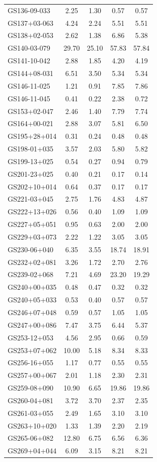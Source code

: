\documentclass{aa}
\begin{document}
\begin{table}
\begin{tabular}{l c c c c }
GS136-09-033	&	2.25	&	1.30	&	0.57	&	0.57	\\
GS137+03-063	&	4.24	&	2.24	&	5.51	&	5.51	\\
GS138+02-053	&	2.62	&	1.38	&	6.86	&	5.38	\\
GS140-03-079	&	29.70	&	25.10	&	57.83	&	57.84	\\
GS141-10-042	&	2.88	&	1.85	&	4.20	&	4.19	\\
GS144+08-031	&	6.51	&	3.50	&	5.34	&	5.34	\\
GS146-11-025	&	1.21	&	0.91	&	7.85	&	7.86	\\
GS146-11-045	&	0.41	&	0.22	&	2.38	&	0.72	\\
GS153+02-047	&	2.46	&	1.40	&	7.79	&	7.74	\\
GS164+00-021	&	2.88	&	3.07	&	5.81	&	6.50	\\
GS195+28+014	&	0.31	&	0.24	&	0.48	&	0.48	\\
GS198-01+035	&	3.57	&	2.03	&	5.80	&	5.82	\\
GS199-13+025	&	0.54	&	0.27	&	0.94	&	0.79	\\
GS201-23+025	&	0.40	&	0.21	&	0.17	&	0.14	\\
GS202+10+014	&	0.64	&	0.37	&	0.17	&	0.17	\\
GS221-03+045	&	2.75	&	1.76	&	4.83	&	4.87	\\
GS222+13+026	&	0.56	&	0.40	&	1.09	&	1.09	\\
GS227+05+051	&	0.95	&	0.63	&	2.00	&	2.00	\\
GS229+03+073	&	2.22	&	1.22	&	3.05	&	3.05	\\
GS230-06+040	&	6.35	&	3.55	&	18.74	&	18.91	\\
GS232+02+081	&	3.26	&	1.72	&	2.70	&	2.76	\\
GS239-02+068	&	7.21	&	4.69	&	23.20	&	19.29	\\
GS240+00+035	&	0.48	&	0.47	&	0.32	&	0.32	\\
GS240+05+033	&	0.53	&	0.40	&	0.57	&	0.57	\\
GS246+07+048	&	0.59	&	0.57	&	1.05	&	1.05	\\
GS247+00+086	&	7.47	&	3.75	&	6.44	&	5.37	\\
GS253-12+053	&	4.56	&	2.95	&	0.66	&	0.59	\\
GS253+07+062	&	10.00	&	5.18	&	8.34	&	8.33	\\
GS256-16+055	&	1.17	&	0.77	&	0.55	&	0.55	\\
GS257+00+067	&	2.01	&	1.18	&	2.30	&	2.31	\\
GS259-08+090	&	10.90	&	6.65	&	19.86	&	19.86	\\
GS260-04+081	&	3.72	&	3.70	&	2.37	&	2.35	\\
GS261-03+055	&	2.49	&	1.65	&	3.10	&	3.10	\\
GS263+10+020	&	1.33	&	1.39	&	2.20	&	2.19	\\
GS265-06+082	&	12.80	&	6.75	&	6.56	&	6.36	\\
GS269+04+044	&	6.09	&	3.15	&	8.21	&	8.21	\\
\hline
\end{tabular}
\end{table}
\end{document}
